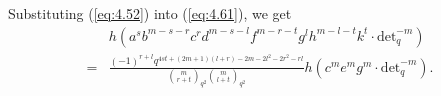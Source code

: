 \documentclass[table,a4paper,reqno]{amsart}
\numberwithin{equation}{section}
\theoremstyle{definition}
\begin{document}
Substituting (\ref{eq:4.52}) into (\ref{eq:4.61}), we get
\begin{equation}\label{eq:4.63}
    \begin{split}
        &h\left(a^sb^{m-s-r}c^rd^{m-s-l}f^{m-r-t}g^lh^{m-l-t}k^{t}\cdot\text{det}_q^{-m}\right)\\
        =&\frac{(-1)^{r+l}q^{4st+(2m+1)(l+r)-2m-2l^2-2r^2-rl}}{{m\choose r+t}_{q^2}{m\choose l+t}_{q^2}}h\left(c^me^mg^m\cdot\text{det}_q^{-m}\right).
    \end{split}
\end{equation}
\end{document}
